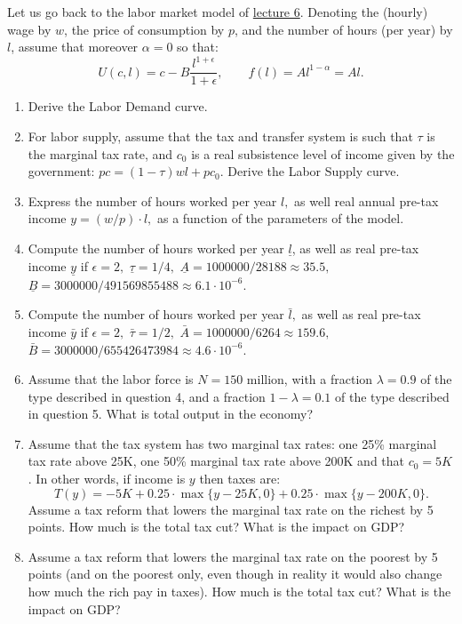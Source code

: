 \documentclass[]{book}
\begin{document}
Let us go back to the labor market model of
\protect\hyperlink{labor-market}{lecture 6}. Denoting the (hourly) wage
by \(w\), the price of consumption by \(p\), and the number of hours
(per year) by \(l\), assume that moreover \(\alpha=0\) so that:
\[U(c, l)=c-B\frac{l^{1+\epsilon}}{1+\epsilon}, \qquad f(l)=Al^{1-\alpha} = A l.\]

\begin{enumerate}
\def\labelenumi{\arabic{enumi}.}
\item
  Derive the Labor Demand curve.
\item
  For labor supply, assume that the tax and transfer system is such that
  \(\tau\) is the marginal tax rate, and \(c_0\) is a real subsistence
  level of income given by the government: \(pc = (1-\tau)wl + p c_0\).
  Derive the Labor Supply curve.
\item
  Express the number of hours worked per year \(l,\) as well real annual
  pre-tax income \(y=(w/p) \cdot l,\) as a function of the parameters of
  the model.
\item
  Compute the number of hours worked per year \(\underline{l}\), as well
  as real pre-tax income \(\underline{y}\) if \(\epsilon = 2,\)
  \(\underline{\tau}=1/4,\)
  \(\underline{A}= 1000000/28188\approx 35.5,\)
  \(\underline{B}= 3000000/491569855488 \approx 6.1 \cdot 10^{-6}.\)
\item
  Compute the number of hours worked per year \(\bar{l},\) as well as
  real pre-tax income \(\bar{y}\) if \(\epsilon = 2,\)
  \(\bar{\tau}=1/2,\) \(\bar{A}= 1000000/6264\approx 159.6,\)
  \(\bar{B}=3000000/655426473984 \approx 4.6 \cdot 10^{-6}.\)
\item
  Assume that the labor force is \(N = 150\) million, with a fraction
  \(\lambda = 0.9\) of the type described in question 4, and a fraction
  \(1-\lambda = 0.1\) of the type described in question 5. What is total
  output in the economy?
\item
  Assume that the tax system has two marginal tax rates: one 25\%
  marginal tax rate above 25K, one 50\% marginal tax rate above 200K and
  that \(c_0=5K\). In other words, if income is \(y\) then taxes are:
  \[T(y) = -5K + 0.25\cdot \max \{ y-25K, 0 \} + 0.25\cdot \max \{ y-200K, 0 \}.\]
  Assume a tax reform that lowers the marginal tax rate on the richest
  by 5 points. How much is the total tax cut? What is the impact on GDP?
\item
  Assume a tax reform that lowers the marginal tax rate on the poorest
  by 5 points (and on the poorest only, even though in reality it would
  also change how much the rich pay in taxes). How much is the total tax
  cut? What is the impact on GDP?
\end{enumerate}
\end{document}
